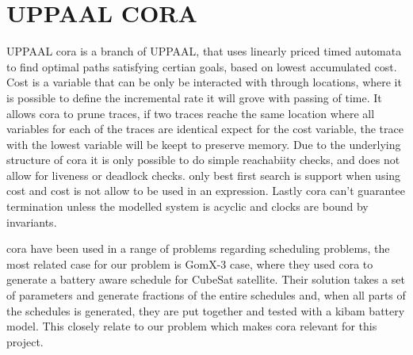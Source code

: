 \section{UPPAAL CORA}
UPPAAL \acrfull{cora} is a branch of UPPAAL, that uses linearly priced timed automata to find optimal paths satisfying certian goals, based on lowest accumulated cost\cite{cs_cora}. Cost is a variable that can be only be interacted with through locations, where it is possible to define the incremental rate it will grove with passing of time. It allows \gls{cora} to prune traces, if two traces reache the same location where all variables for each of the traces are identical expect for the cost variable, the trace with the lowest variable will be keept to preserve memory. Due to the underlying structure of \gls{cora} it is only possible to do simple reachabiity checks, and does not allow for liveness or deadlock checks. only best first search is support when using cost and cost is not allow to be used in an expression. Lastly \gls{cora} can't guarantee termination unless the modelled system is acyclic and clocks are bound by invariants.

\Gls{cora} have been used in a range of problems regarding scheduling problems, the most related case for our problem is GomX-3 case, where they used \gls{cora} to generate a battery aware schedule for CubeSat satellite. Their solution takes a set of parameters and generate fractions of the entire schedules and, when all parts of the schedules is generated, they are put together and tested with a \gls{kibam} battery model. This closely relate to our problem which makes \gls{cora} relevant for this project.







